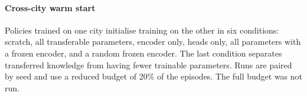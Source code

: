 \paragraph{Cross-city warm start} Policies trained on one city initialise training on the other in six conditions: scratch, all transferable parameters, encoder only, heads only, all parameters with a frozen encoder, and a random frozen encoder. The last condition separates transferred knowledge from having fewer trainable parameters. Runs are paired by seed and use a reduced budget of 20\% of the episodes. The full budget was not run.
